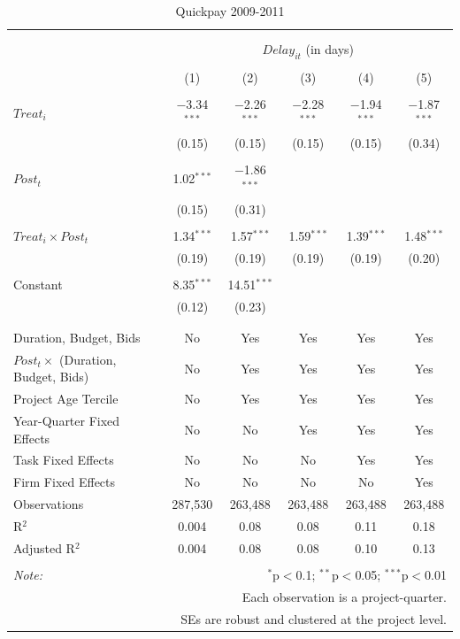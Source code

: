 \documentclass[
]{article}
\begin{document}
\begin{table}[H] \centering 
  \caption{Quickpay 2009-2011} 
  \label{} 
\small 
\begin{tabular}{@{\extracolsep{-2pt}}lccccc} 
\\[-1.8ex]\hline 
\hline \\[-1.8ex] 
\\[-1.8ex] & \multicolumn{5}{c}{$Delay_{it}$ (in days)} \\ 
\\[-1.8ex] & (1) & (2) & (3) & (4) & (5)\\ 
\hline \\[-1.8ex] 
 $Treat_i$ & $-$3.34$^{***}$ & $-$2.26$^{***}$ & $-$2.28$^{***}$ & $-$1.94$^{***}$ & $-$1.87$^{***}$ \\ 
  & (0.15) & (0.15) & (0.15) & (0.15) & (0.34) \\ 
  & & & & & \\ 
 $Post_t$ & 1.02$^{***}$ & $-$1.86$^{***}$ &  &  &  \\ 
  & (0.15) & (0.31) &  &  &  \\ 
  & & & & & \\ 
 $Treat_i \times Post_t$ & 1.34$^{***}$ & 1.57$^{***}$ & 1.59$^{***}$ & 1.39$^{***}$ & 1.48$^{***}$ \\ 
  & (0.19) & (0.19) & (0.19) & (0.19) & (0.20) \\ 
  & & & & & \\ 
 Constant & 8.35$^{***}$ & 14.51$^{***}$ &  &  &  \\ 
  & (0.12) & (0.23) &  &  &  \\ 
  & & & & & \\ 
\hline \\[-1.8ex] 
Duration, Budget, Bids & No & Yes & Yes & Yes & Yes \\ 
$Post_t \times$  (Duration, Budget, Bids) & No & Yes & Yes & Yes & Yes \\ 
Project Age Tercile & No & Yes & Yes & Yes & Yes \\ 
Year-Quarter Fixed Effects & No & No & Yes & Yes & Yes \\ 
Task Fixed Effects & No & No & No & Yes & Yes \\ 
Firm Fixed Effects & No & No & No & No & Yes \\ 
Observations & 287,530 & 263,488 & 263,488 & 263,488 & 263,488 \\ 
R$^{2}$ & 0.004 & 0.08 & 0.08 & 0.11 & 0.18 \\ 
Adjusted R$^{2}$ & 0.004 & 0.08 & 0.08 & 0.10 & 0.13 \\ 
\hline 
\hline \\[-1.8ex] 
\textit{Note:}  & \multicolumn{5}{r}{$^{*}$p$<$0.1; $^{**}$p$<$0.05; $^{***}$p$<$0.01} \\ 
 & \multicolumn{5}{r}{Each observation is a project-quarter.} \\ 
 & \multicolumn{5}{r}{SEs are robust and clustered at the project level.} \\ 
\end{tabular} 
\end{table}
\end{document}
